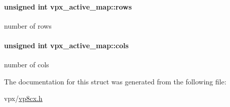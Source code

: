 \paragraph[{\texorpdfstring{rows}{rows}}]{\setlength{\rightskip}{0pt plus 5cm}unsigned int vpx\+\_\+active\+\_\+map\+::rows}\hypertarget{structvpx__active__map_a29424c92ff201f97db9bf62d16dfab4d}{}\label{structvpx__active__map_a29424c92ff201f97db9bf62d16dfab4d}
number of rows 
\paragraph[{\texorpdfstring{cols}{cols}}]{\setlength{\rightskip}{0pt plus 5cm}unsigned int vpx\+\_\+active\+\_\+map\+::cols}\hypertarget{structvpx__active__map_a310edb5efc62d596b2c276e3f7d1b42a}{}\label{structvpx__active__map_a310edb5efc62d596b2c276e3f7d1b42a}
number of cols 

The documentation for this struct was generated from the following file\+:\begin{DoxyCompactItemize}
\item 
vpx/\hyperlink{vp8cx_8h}{vp8cx.\+h}\end{DoxyCompactItemize}
